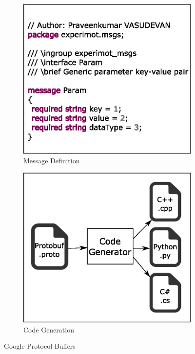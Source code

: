 \begin{figure}
\centering
\begin{subfigure}[t]{0.48\textwidth}
\includegraphics[width=\textwidth]{assets/protobuf_definition.eps}
\caption[Message Definition]{Message Definition}
\label{fig:protobuf_def}
\end{subfigure}
\begin{subfigure}[t]{0.48\textwidth}
\includegraphics[width=\textwidth]{assets/protobuf_codegen.eps}
\caption[Code Generation]{Code Generation}
\label{fig:protobuf_codegen}
\end{subfigure}
\caption[Google Protocol Buffers]{Google Protocol Buffers}
\label{fig:protobuf}
\end{figure}
